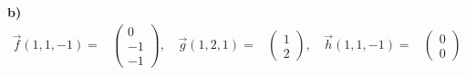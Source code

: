 {
\textbf{b)} \begin{align*}
\vec f(1,1,-1)=& \begin{pmatrix}0\\-1\\-1\end{pmatrix},\, 
&\vec g(1,2,1)=&  \begin{pmatrix}1\\2\end{pmatrix},\, 
&\vec h(1,1,-1)=& \begin{pmatrix}0\\0\end{pmatrix}
\end{align*}
}
